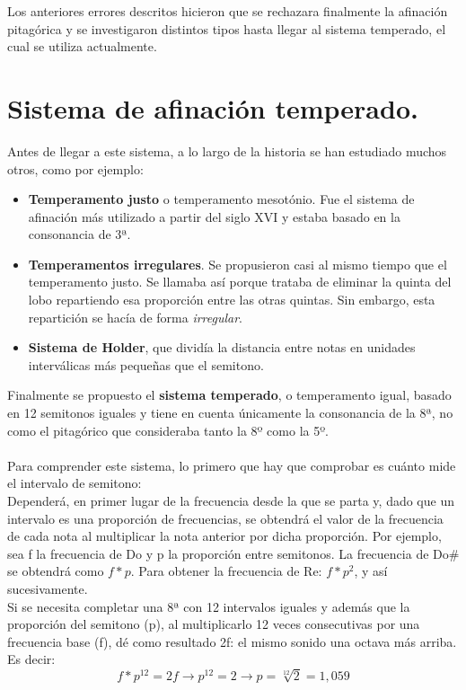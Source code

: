 \documentclass[a4paper, openright, 11pt, titlepage]{report}
\theoremstyle{definition}\newtheorem{defin}[propo]{Definition}
\theoremstyle{definition}\newtheorem{obser}[propo]{Remark}
\theoremstyle{definition}\newtheorem{ejem}[propo]{Ejemplo}
\theoremstyle{definition}\newtheorem{algoritmo}[propo]{Algoritmo}
\begin{document}
Los anteriores errores descritos hicieron que se rechazara finalmente la afinación pitagórica y se investigaron distintos tipos hasta llegar al sistema temperado, el cual se utiliza actualmente.

\section{Sistema de afinación temperado.}
Antes de llegar a este sistema, a lo largo de la historia se han estudiado muchos otros, como por ejemplo: 
\begin{itemize}
    \item \textbf{Temperamento justo} o temperamento mesotónio. Fue el sistema de afinación más utilizado a partir del siglo XVI y estaba basado en la consonancia de 3ª. 
    \item \textbf{Temperamentos irregulares}. Se propusieron casi al mismo tiempo que el temperamento justo. Se llamaba así porque trataba de eliminar la quinta del lobo repartiendo esa proporción entre las otras quintas. Sin embargo, esta repartición se hacía de forma \textit{irregular}.
    \item \textbf{Sistema de Holder}, que dividía la distancia entre notas en unidades interválicas más pequeñas que el semitono.
\end{itemize}
Finalmente se propuesto el \textbf{sistema temperado}, o temperamento igual, basado en 12 semitonos iguales y tiene en cuenta únicamente la consonancia de la 8ª, no como el pitagórico que consideraba tanto la 8º como la 5º.\\\\
Para comprender este sistema, lo primero que hay que comprobar es cuánto mide el intervalo de semitono:\\
Dependerá, en primer lugar de la frecuencia desde la que se parta y, dado que un intervalo es una proporción de frecuencias, se obtendrá el valor de la frecuencia de cada nota al multiplicar la nota anterior por dicha proporción. Por ejemplo, sea f la frecuencia de Do y p la proporción entre semitonos. La frecuencia de Do# se obtendrá como $f*p$. Para obtener la frecuencia de Re: $f*p^{2}$, y así sucesivamente.\\
Si se necesita completar una 8ª con 12 intervalos iguales y además que la proporción del semitono (p), al multiplicarlo 12 veces consecutivas por una frecuencia base (f), dé como resultado 2f: el mismo sonido una octava más arriba. Es decir: $$f*p^{12} = 2f \longrightarrow p^{12} = 2 \longrightarrow p = \sqrt[12]{2} = 1,059$$
\end{document}
